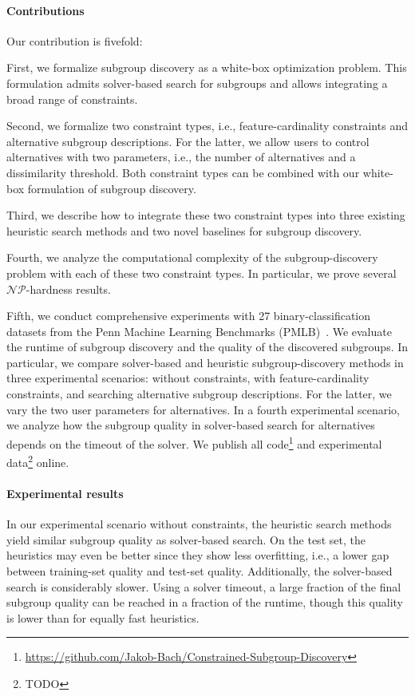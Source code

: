 \documentclass{article}
\theoremstyle{definition}
\begin{document}
\paragraph{Contributions}

Our contribution is fivefold:

First, we formalize subgroup discovery as a white-box optimization problem.
This formulation admits solver-based search for subgroups and allows integrating a broad range of constraints.

Second, we formalize two constraint types, i.e., feature-cardinality constraints and alternative subgroup descriptions.
For the latter, we allow users to control alternatives with two parameters, i.e., the number of alternatives and a dissimilarity threshold.
Both constraint types can be combined with our white-box formulation of subgroup discovery.

Third, we describe how to integrate these two constraint types into three existing heuristic search methods and two novel baselines for subgroup discovery.

Fourth, we analyze the computational complexity of the subgroup-discovery problem with each of these two constraint types.
In particular, we prove several $\mathcal{NP}$-hardness results.

Fifth, we conduct comprehensive experiments with 27 binary-classification datasets from the Penn Machine Learning Benchmarks (PMLB)~\cite{olson2017pmlb, romano2021pmlb}.
We evaluate the runtime of subgroup discovery and the quality of the discovered subgroups.
In particular, we compare solver-based and heuristic subgroup-discovery methods in three experimental scenarios:
without constraints, with feature-cardinality constraints, and searching alternative subgroup descriptions.
For the latter, we vary the two user parameters for alternatives.
In a fourth experimental scenario, we analyze how the subgroup quality in solver-based search for alternatives depends on the timeout of the solver.
We publish all code\footnote{\url{https://github.com/Jakob-Bach/Constrained-Subgroup-Discovery}} and experimental data\footnote{TODO} online.

\paragraph{Experimental results}

In our experimental scenario without constraints, the heuristic search methods yield similar subgroup quality as solver-based search.
On the test set, the heuristics may even be better since they show less overfitting, i.e., a lower gap between training-set quality and test-set quality.
Additionally, the solver-based search is considerably slower.
Using a solver timeout, a large fraction of the final subgroup quality can be reached in a fraction of the runtime, though this quality is lower than for equally fast heuristics.
\end{document}
